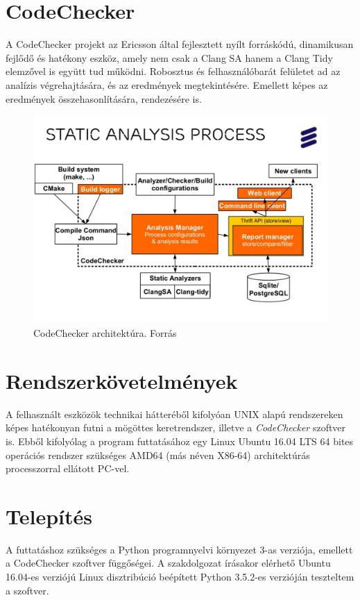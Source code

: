 \documentclass[a4paper,12pt]{report}
\begin{document}
\section{CodeChecker}
A CodeChecker projekt az Ericsson által fejlesztett nyílt forráskódú, dinamikusan fejlődő és hatékony eszköz, amely nem csak a Clang SA hanem a Clang Tidy elemzővel is együtt tud működni. Robosztus és felhasználóbarát felületet ad az analízis végrehajtására, és az eredmények megtekintésére. Emellett képes az eredmények összehasonlítására, rendezésére is.

\begin{figure}[h]
\caption{CodeChecker architektúra. Forrás \cite{codecheckerslide}}
\centering
\includegraphics[scale=0.2]{codechecker.png}
\end{figure}

\section{Rendszerkövetelmények}
A felhasznált eszközök technikai hátteréből kifolyóan UNIX alapú rendszereken képes hatékonyan futni a mögöttes keretrendszer, illetve a \emph{CodeChecker} szoftver is. Ebből kifolyólag a program futtatásához egy Linux Ubuntu 16.04 LTS 64 bites operációs rendszer szükséges AMD64 (más néven X86-64) architektúrás processzorral ellátott PC-vel.

\section{Telepítés}
A futtatáshoz szükséges a Python programnyelvi környezet 3-as verziója, emellett a CodeChecker szoftver függőségei. A szakdolgozat írásakor elérhető Ubuntu 16.04-es verziójú Linux disztribúció beépített Python 3.5.2-es verzióján teszteltem a szoftver.
\end{document}
